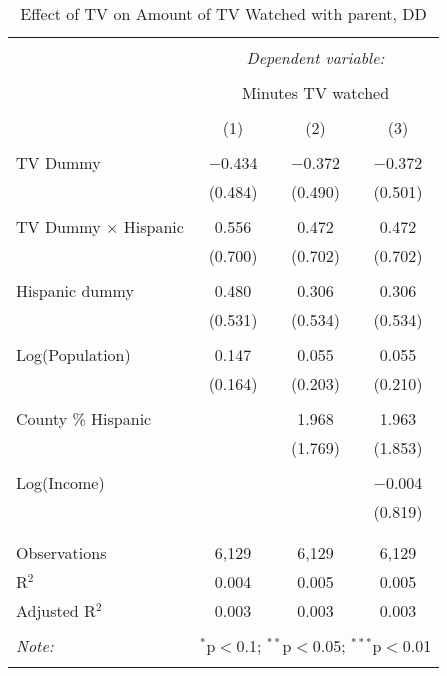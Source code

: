
\begin{table}[!htbp] \centering 
  \caption{Effect of TV on Amount of TV Watched with parent, DD} 
  \label{} 
\begin{tabular}{@{\extracolsep{-5pt}}lccc} 
\\[-1.8ex]\hline 
\hline \\[-1.8ex] 
 & \multicolumn{3}{c}{\textit{Dependent variable:}} \\ 
\cline{2-4} 
\\[-1.8ex] & \multicolumn{3}{c}{Minutes TV watched} \\ 
\\[-1.8ex] & (1) & (2) & (3)\\ 
\hline \\[-1.8ex] 
 TV Dummy & $-$0.434 & $-$0.372 & $-$0.372 \\ 
  & (0.484) & (0.490) & (0.501) \\ 
  & & & \\ 
 TV Dummy $\times$ Hispanic  & 0.556 & 0.472 & 0.472 \\ 
  & (0.700) & (0.702) & (0.702) \\ 
  & & & \\ 
 Hispanic dummy & 0.480 & 0.306 & 0.306 \\ 
  & (0.531) & (0.534) & (0.534) \\ 
  & & & \\ 
 Log(Population) & 0.147 & 0.055 & 0.055 \\ 
  & (0.164) & (0.203) & (0.210) \\ 
  & & & \\ 
 County \% Hispanic &  & 1.968 & 1.963 \\ 
  &  & (1.769) & (1.853) \\ 
  & & & \\ 
 Log(Income) &  &  & $-$0.004 \\ 
  &  &  & (0.819) \\ 
  & & & \\ 
\hline \\[-1.8ex] 
Observations & 6,129 & 6,129 & 6,129 \\ 
R$^{2}$ & 0.004 & 0.005 & 0.005 \\ 
Adjusted R$^{2}$ & 0.003 & 0.003 & 0.003 \\ 
\hline 
\hline \\[-1.8ex] 
\textit{Note:}  & \multicolumn{3}{r}{$^{*}$p$<$0.1; $^{**}$p$<$0.05; $^{***}$p$<$0.01} \\ 
 & \multicolumn{3}{r}{} \\ 
\end{tabular} 
\end{table} 
